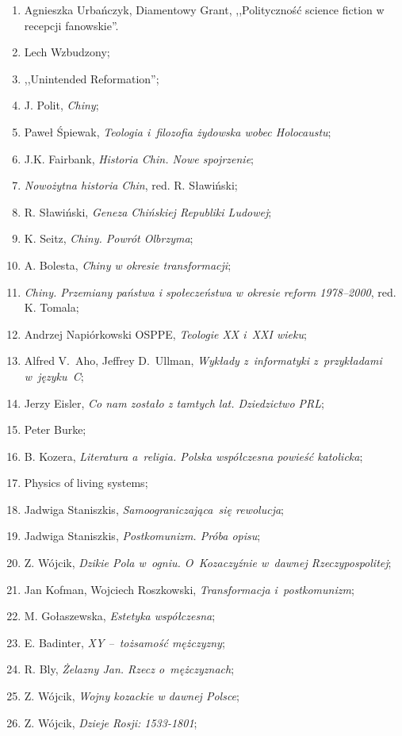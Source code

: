 \documentclass[a4paper,11pt]{article}
\begin{document}
\begin{enumerate}
\item Agnieszka Urbańczyk, Diamentowy Grant, ,,Polityczność science
  fiction w recepcji fanowskie''.
\item Lech Wzbudzony;
\item ,,Unintended Reformation'';
\item J. Polit, \emph{Chiny};
\item Paweł Śpiewak, \emph{Teologia i~filozofia żydowska wobec
    Holocaustu};
\item J.K. Fairbank, \emph{Historia Chin. Nowe spojrzenie};
\item \emph{Nowożytna historia Chin}, red. R. Sławiński;
\item R. Sławiński, \emph{Geneza Chińskiej Republiki Ludowej};
\item K. Seitz, \emph{Chiny. Powrót Olbrzyma};
\item A. Bolesta, \emph{Chiny w okresie transformacji};
\item \emph{Chiny. Przemiany państwa i społeczeństwa w okresie reform
    1978--2000}, red. K. Tomala;
\item Andrzej Napiórkowski OSPPE, \emph{Teologie XX i~XXI wieku};
\item Alfred V.~Aho, Jeffrey D.~Ullman, \emph{Wykłady z~informatyki
    z~przykładami w~języku~C};
\item Jerzy Eisler, \emph{Co nam zostało z tamtych lat. Dziedzictwo
    PRL};
\item Peter Burke;
\item B. Kozera, \emph{Literatura a~religia. Polska współczesna
    powieść katolicka};
\item Physics of living systems;
\item Jadwiga Staniszkis, \emph{Samoograniczająca~się rewolucja};
\item Jadwiga Staniszkis, \emph{Postkomunizm. Próba opisu};
\item Z. Wójcik, \emph{Dzikie Pola w~ogniu. O~Kozaczyźnie w~dawnej
    Rzeczypospolitej};
\item Jan Kofman, Wojciech Roszkowski, \emph{Transformacja
    i~postkomunizm};
\item M. Gołaszewska, \emph{Estetyka współczesna};
\item E. Badinter, \emph{XY --~tożsamość mężczyzny};
\item R. Bly, \emph{Żelazny Jan. Rzecz o~mężczyznach};
\item Z. Wójcik, \emph{Wojny kozackie w dawnej Polsce};
\item Z. Wójcik, \emph{Dzieje Rosji: 1533-1801};

\end{enumerate}
\end{document}
